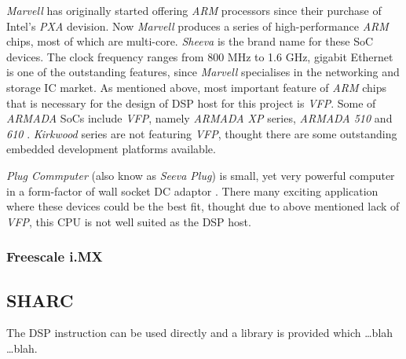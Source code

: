   \emph{Marvell} has originally started offering \emph{ARM} processors
 since their purchase of Intel's \emph{PXA} devision. Now \emph{Marvell}
 produces a series of high-performance \emph{ARM} chips, most of which
 are multi-core. \emph{Sheeva} is the brand name for these SoC devices.
 The clock frequency ranges from 800 MHz to 1.6 GHz, gigabit Ethernet
 is one of the outstanding features, since \emph{Marvell} specialises
 in the networking and storage IC market. As mentioned above, most
 important feature of \emph{ARM} chips that is necessary for the design
 of DSP host for this project is \emph{VFP}. Some of \emph{ARMADA}
 SoCs include \emph{VFP}, namely \emph{ARMADA XP} series,
 \emph{ARMADA 510} and \emph{610} \cite{links:marvell:armada}.
 \emph{Kirkwood} series are not featuring \emph{VFP}, thought there
 are some outstanding embedded development platforms available.

  \emph{Plug Commputer} (also know as \emph{Seeva Plug}) is small, yet
 very powerful computer in a form-factor of wall socket DC adaptor
 \cite{links:marvell:plug,links:plugcomp:homepage}. There many exciting
 application where these devices could be the best fit, thought due to
 above mentioned lack of \emph{VFP}, this CPU is not well suited as the
 DSP host.


\subsubsection{Freescale i.MX}



\subsection{SHARC}

  The DSP instruction can be used directly and a library is provided
 which \dots blah \dots blah.

